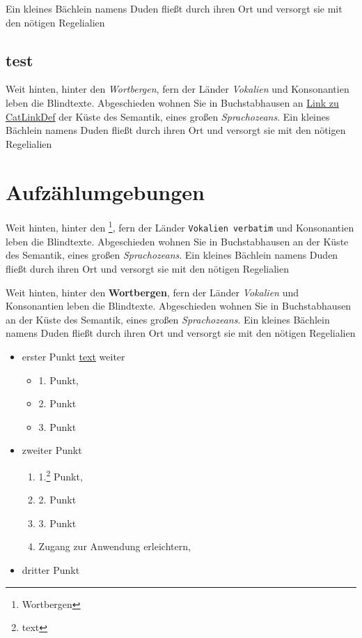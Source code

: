 \documentclass[%
	12pt,%
	a4paper,%
	oneside,%
	liststotoc, idxtotoc, bibtotoc, %
	parskip=half,%
	nochapterprefix,%
	appendixprefix, %
	headings=small,%
]{scrreprt}
\begin{document}
Ein kleines Bächlein namens Duden fließt durch ihren Ort und versorgt sie mit den nötigen Regelialien %

\tableofcontents

\listoffigures

\listoftables

\section{test}

Weit hinten, hinter den \emph{Wortbergen}, fern der Länder \emph{Vokalien} und Konsonantien leben die Blindtexte. Abgeschieden wohnen Sie in Buchstabhausen an \hyperref{URL}{cat1}{link}{Link zu CatLinkDef} der Küste des Semantik, eines großen \textsl{Sprachozeans}. Ein kleines Bächlein namens Duden fließt durch ihren Ort und versorgt sie mit den nötigen Regelialien %

\chapter{Aufzählumgebungen}
\label{sec:Aufzaehlumgebung}

Weit hinten, hinter den \footnote{Wortbergen}, fern der Länder \verb|Vokalien verbatim| und Konsonantien leben die Blindtexte. Abgeschieden wohnen Sie in Buchstabhausen an der Küste des Semantik, eines großen \textsl{Sprachozeans}. Ein kleines Bächlein namens Duden fließt durch ihren Ort und versorgt sie mit den nötigen Regelialien %

Weit hinten, hinter den \textbf{Wortbergen}, fern der Länder \textit{Vokalien} und Konsonantien leben die Blindtexte. Abgeschieden wohnen Sie in Buchstabhausen an der Küste des Semantik, eines großen \textsl{Sprachozeans}. Ein kleines Bächlein namens Duden fließt durch ihren Ort und versorgt sie mit den nötigen Regelialien %

\begin{itemize}
	\item erster Punkt \href{www.test.de}{text} weiter
	\begin{itemize}
		\item 1. Punkt, 
		\item 2. Punkt 
		\item 3. Punkt
	\end{itemize}
	\item zweiter Punkt
	\begin{enumerate}
		\item 1.\footnote{text} Punkt,
		\item 2. Punkt
		\item 3. Punkt
		\item Zugang zur Anwendung erleichtern,
	\end{enumerate}
	\item dritter Punkt
\end{itemize}
\end{document}
